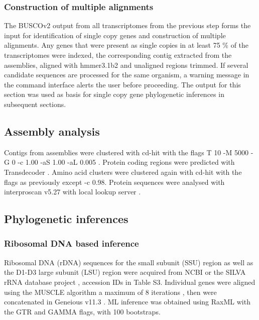 \documentclass[12pt]{article}
\begin{document}
\subsubsection*{Construction of multiple alignments}
The BUSCOv2 output from all transcriptomes from the previous step forms the input for identification of single copy genes and construction of multiple alignments. 
Any genes that were present as single copies in at least 75 \% of the transcriptomes were indexed, the corresponding contig extracted from the assemblies, aligned with hmmer3.1b2 \cite{eddy2015hmmer} and unaligned regions trimmed.
If several candidate sequences are processed for the same organism, a warning message in the command interface alerts the user before proceeding. 
The output for this section was used as basis for single copy gene phylogenetic inferences in subsequent sections.

\subsection*{Assembly analysis}
Contigs from assemblies were clustered with cd-hit with the flags T 10 -M 5000 -G 0 -c 1.00 -aS 1.00 -aL 0.005 \cite{fu2012cd}. 
Protein coding regions were predicted with Transdecoder \cite{haas2016transdecoder}.
Amino acid clusters were clustered again with cd-hit with the flags as previously except -c 0.98.
Protein sequences were analysed with interproscan v5.27 with local lookup server \cite{quevillon2005interproscan}.

\subsection*{Phylogenetic inferences}
\subsubsection*{Ribosomal DNA based inference}
Ribosomal DNA (rDNA) sequences for the small subunit (SSU) region as well as the D1-D3 large subunit (LSU) region were acquired from NCBI \cite{coordinators2017database} or the SILVA rRNA database project \cite{silvaproj}, accession IDs in Table S3. 
Individual genes were aligned using the MUSCLE algorithm a maximum of 8 iterations \cite{edgar2004muscle}, then were concatenated in Geneious v11.3 \cite{kearse2012geneious}.
ML inference was obtained using RaxML \cite{stamatakis2014raxml} with the GTR and GAMMA flags, with 100 bootstraps.
\end{document}
